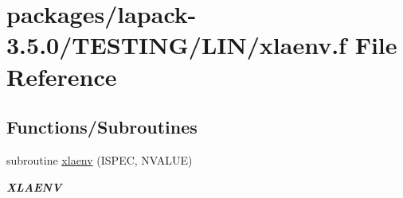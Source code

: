 \hypertarget{LIN_2xlaenv_8f}{}\section{packages/lapack-\/3.5.0/\+T\+E\+S\+T\+I\+N\+G/\+L\+I\+N/xlaenv.f File Reference}
\label{LIN_2xlaenv_8f}
\subsection*{Functions/\+Subroutines}
\begin{DoxyCompactItemize}
\item 
subroutine \hyperlink{group__aux__lin_gae6f1eead77499e53bd640389a95288c4}{xlaenv} (I\+S\+P\+E\+C, N\+V\+A\+L\+U\+E)
\begin{DoxyCompactList}\small\item\em {\bfseries X\+L\+A\+E\+N\+V} \end{DoxyCompactList}\end{DoxyCompactItemize}
